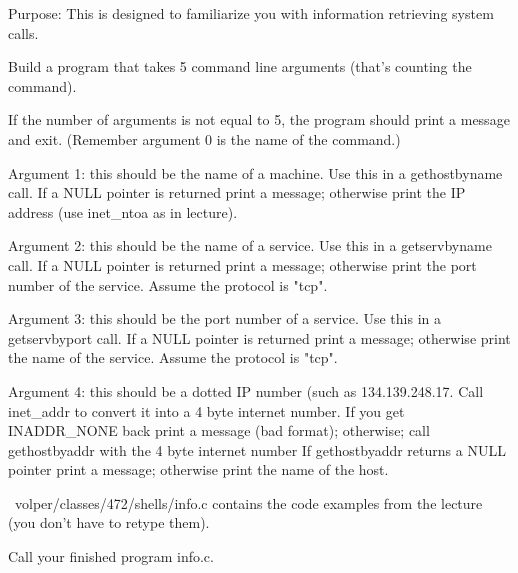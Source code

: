 

\parindent 0pt

Purpose: This is designed to familiarize you with information
retrieving system calls.

Build a program that takes 5 command line arguments
(that's counting the command).

If the number of arguments is not equal to 5, the program
should print a message and exit.
(Remember argument 0 is the name of the command.)

Argument 1: this should be the name of a machine.
Use this in a {\ltt{}gethostbyname} call.
If a {\ltt{}NULL} pointer is returned print a message;
otherwise print the IP address (use {\ltt{}inet_ntoa} as in lecture).

Argument 2: this should be the name of a service.
Use this in a {\ltt{}getservbyname} call.
If a {\ltt{}NULL} pointer is returned print a message;
otherwise print the port number of the service.
Assume the protocol is {\ltt{}"tcp"}.

Argument 3: this should be the port number of a service.
Use this in a {\ltt{}getservbyport} call.
If a {\ltt{}NULL} pointer is returned print a message;
otherwise print the name of the service.
Assume the protocol is {\ltt{}"tcp"}.

Argument 4: this should be a dotted IP number (such as
134.139.248.17. Call {\ltt{}inet_addr} to convert it into
a 4 byte internet number.
If you get {\ltt{}INADDR_NONE} back print a message (bad format);
otherwise; call {\ltt{}gethostbyaddr} with the 4 byte internet number
If {\ltt{}gethostbyaddr} returns a {\ltt{}NULL} pointer print a message;
otherwise print the name of the host.

{\ltt{}~volper/classes/472/shells/info.c} contains 
the code examples from the lecture
(you don't have to retype them).

Call your finished program {\ltt{}info.c}.
\bye
